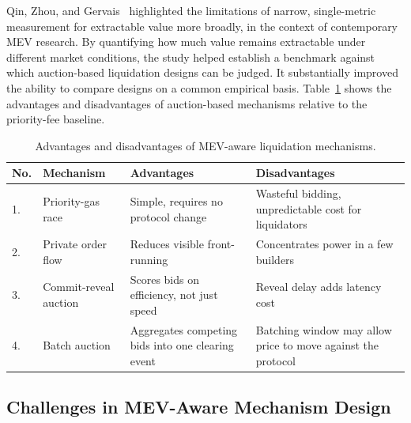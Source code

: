 \documentclass[conference]{IEEEtran}
\begin{document}
Qin, Zhou, and Gervais~\cite{qin2022quantifying} highlighted the
limitations of narrow, single-metric measurement for extractable value
more broadly, in the context of contemporary MEV research. By
quantifying how much value remains extractable under different market
conditions, the study helped establish a benchmark against which
auction-based liquidation designs can be judged. It substantially
improved the ability to compare designs on a common empirical basis.
Table~\ref{tab:comparison} shows the advantages and disadvantages of
auction-based mechanisms relative to the priority-fee baseline.

\begin{table}[!t]
\caption{Advantages and disadvantages of MEV-aware liquidation mechanisms.}
\label{tab:comparison}
\centering
\renewcommand{\arraystretch}{1.2}
\footnotesize
\setlength{\tabcolsep}{3pt}
\begin{tabular}{p{0.55cm}p{1.5cm}p{2.7cm}p{2.7cm}}
\toprule
\textbf{No.} & \textbf{Mechanism} & \textbf{Advantages} & \textbf{Disadvantages} \\
\midrule
1. & Priority-gas race & Simple, requires no protocol change & Wasteful bidding, unpredictable cost for liquidators \\
2. & Private order flow & Reduces visible front-running & Concentrates power in a few builders \\
3. & Commit-reveal auction & Scores bids on efficiency, not just speed & Reveal delay adds latency cost \\
4. & Batch auction & Aggregates competing bids into one clearing event & Batching window may allow price to move against the protocol \\
\bottomrule
\end{tabular}
\end{table}

\subsection{Challenges in MEV-Aware Mechanism Design}
\end{document}
